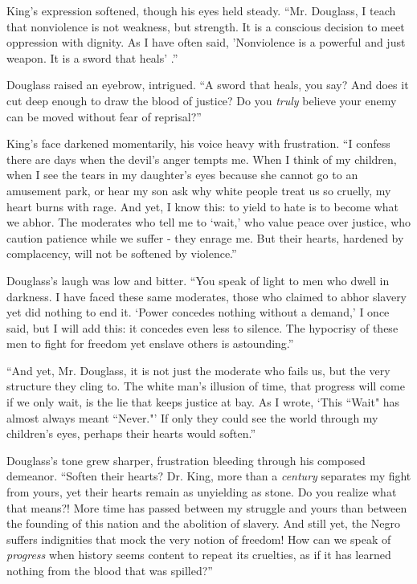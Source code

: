 \documentclass[12pt]{article}
\begin{document}
King’s expression softened, though his eyes held steady. {\color{kingcolor}``Mr. Douglass, I teach that nonviolence is not weakness, but strength. It is a conscious decision to meet oppression with dignity. As I have often said, 'Nonviolence is a powerful and just weapon. It is a sword that heals' \parencite{king1963letter}.''}

Douglass raised an eyebrow, intrigued. {\color{douglasscolor}``A sword that heals, you say? And does it cut deep enough to draw the blood of justice? Do you \textit{truly} believe your enemy can be moved without fear of reprisal?''}

King’s face darkened momentarily, his voice heavy with frustration. {\color{kingcolor}``I confess there are days when the devil's anger tempts me. When I think of my children, when I see the tears in my daughter’s eyes because she cannot go to an amusement park, or hear my son ask why white people treat us so cruelly, my heart burns with rage. And yet, I know this: to yield to hate is to become what we abhor. The moderates who tell me to `wait,' who value peace over justice, who caution patience while we suffer - they enrage me. But their hearts, hardened by complacency, will not be softened by violence.''}

Douglass’s laugh was low and bitter. {\color{douglasscolor}``You speak of light to men who dwell in darkness. I have faced these same moderates, those who claimed to abhor slavery yet did nothing to end it. `Power concedes nothing without a demand,' I once said, but I will add this: it concedes even less to silence. The hypocrisy of these men to fight for freedom yet enslave others is astounding.\parencite{douglass1852fourth}''}

{\color{kingcolor}``And yet, Mr. Douglass, it is not just the moderate who fails us, but the very structure they cling to. The white man’s illusion of time, that progress will come if we only wait, is the lie that keeps justice at bay. As I wrote, `This ``Wait" has almost always meant ``Never."'\newline
If only they could see the world through my children’s eyes, perhaps their hearts would soften.''}

Douglass’s tone grew sharper, frustration bleeding through his composed demeanor. {\color{douglasscolor}``Soften their hearts? Dr. King, more than a \textit{century} separates my fight from yours, yet their hearts remain as unyielding as stone. Do you realize what that means?! More time has passed between my struggle and yours than between the founding of this nation and the abolition of slavery. And still yet, the Negro suffers indignities that mock the very notion of freedom! How can we speak of \textit{progress} when history seems content to repeat its cruelties, as if it has learned nothing from the blood that was spilled?''}
\end{document}

